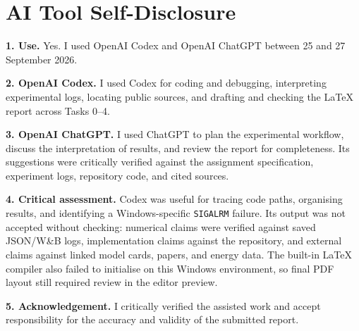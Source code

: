 \documentclass{article}
\begin{document}
\clearpage
\section*{AI Tool Self-Disclosure}

\textbf{1. Use.} Yes. I used OpenAI Codex and OpenAI ChatGPT between 25 and 27
September 2026.

\textbf{2. OpenAI Codex.} I used Codex for coding and debugging, interpreting
experimental logs, locating public sources, and drafting and checking the
LaTeX report across Tasks 0--4.

\textbf{3. OpenAI ChatGPT.} I used ChatGPT to plan the experimental workflow,
discuss the interpretation of results, and review the report for completeness.
Its suggestions were critically verified against the assignment specification,
experiment logs, repository code, and cited sources.

\textbf{4. Critical assessment.} Codex was useful for tracing code paths,
organising results, and identifying a Windows-specific \texttt{SIGALRM}
failure. Its output was not accepted without checking: numerical claims were
verified against saved JSON/W\&B logs, implementation claims against the
repository, and external claims against linked model cards, papers, and energy
data. The built-in LaTeX compiler also failed to initialise on this Windows
environment, so final PDF layout still required review in the editor preview.

\textbf{5. Acknowledgement.} I critically verified the assisted work and
accept responsibility for the accuracy and validity of the submitted report.
\end{document}
